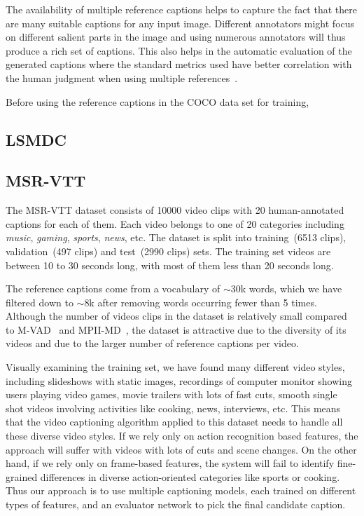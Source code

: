 The availability of multiple reference captions helps to capture the
fact that there are many suitable captions for any input image.
Different annotators might focus on different salient parts in the
image and using numerous annotators will thus produce a rich set of
captions.
This also helps in the automatic evaluation of the generated captions
where the standard metrics used have better correlation with the human
judgment when using multiple references~\cite{Vedantam_2015_CVPR}.

Before using the reference captions in the COCO data set for training,

\subsection{LSMDC}
\subsection{MSR-VTT}
The MSR-VTT dataset consists of 10000 video clips with 20
human-annotated captions for each of them.
Each video belongs to one of 20 categories including \emph{music},
\emph{gaming}, \emph{sports}, \emph{news}, etc.
The dataset is split into training~(6513 clips), validation~(497
clips) and test~(2990 clips) sets. 
The training set videos are between 10 to 30 seconds long, with most
of them less than 20 seconds long.

The reference captions come from a vocabulary of $\sim$30k words,
which we have filtered down to $\sim$8k after removing words occurring
fewer than 5 times.
Although the number of videos clips in the dataset is relatively small
compared to M-VAD~\cite{rohrbach15cvpr} and
MPII-MD~\cite{AtorabiM-VAD2015}, the dataset is attractive due to the
diversity of its videos and due to the larger number of reference
captions per video.

Visually examining the training set, we have found many different
video styles, including slideshows with static images, recordings of
computer monitor showing users playing video games, movie trailers
with lots of fast cuts, smooth single shot videos involving
activities like cooking, news, interviews, etc.
This means that the video captioning algorithm applied to this dataset
needs to handle all these diverse video styles.
If we rely only on action recognition based features, the approach
will suffer with videos with lots of cuts and scene changes.
On the other hand, if we rely only on frame-based features, the system
will fail to identify fine-grained differences in diverse
action-oriented categories like sports or cooking.
Thus our approach is to use multiple captioning models, each trained
on different types of features, and an evaluator network to pick the
final candidate caption.
